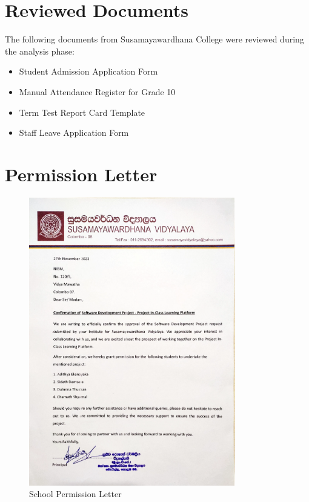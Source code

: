 \documentclass[12pt,a4paper]{report}
\begin{document}
\section{Reviewed Documents}
The following documents from Susamayawardhana College were reviewed during the analysis phase:
\begin{itemize}
    \item Student Admission Application Form
    \item Manual Attendance Register for Grade 10
    \item Term Test Report Card Template
    \item Staff Leave Application Form
\end{itemize}

\section{Permission Letter}

\begin{figure}[htbp]
    \centering
    \includegraphics[width=0.8\textwidth]{school-permission-lettter.png}
    \caption{School Permission Letter}
    \label{fig:permission-letter}
\end{figure}

\end{document}
